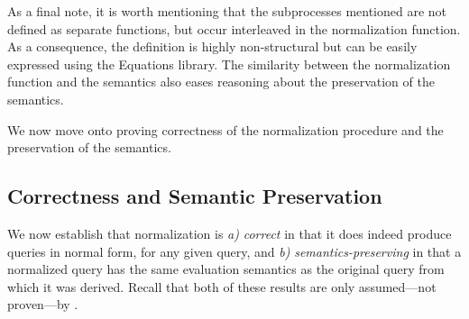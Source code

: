 As a final note, it is worth mentioning that the subprocesses mentioned are not defined as separate functions, but occur interleaved in the normalization function. As a consequence, the definition is highly non-structural but can be easily expressed using the Equations library. The  similarity between the normalization function and the semantics also eases reasoning about the preservation of the semantics. 

We now move onto proving correctness of the normalization procedure and the preservation of the semantics.



\subsection{Correctness and Semantic Preservation}

We now establish that normalization is {\em a)} {\em correct} in that it does indeed produce queries in normal form, for any given query, and {\em b)} {\em semantics-preserving} in that a normalized query has the same evaluation semantics as the original query from which it was derived.
Recall that both of these results are only assumed---not proven---by \HP.

